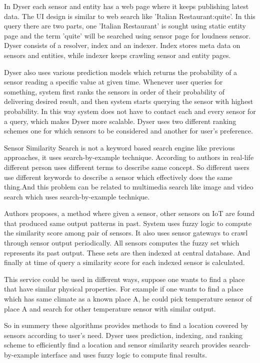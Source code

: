 \documentclass [a4paper,12pt]{book}
\begin{document}
In Dyser\cite{17} each sensor and entity has a web page where it keeps publishing latest data. The UI design is similar to web search like 'Italian Restaurant:quite'. In this query there are two parts, one 'Italian Restaurant' is sought using static entity page and the term 'quite' will be searched using sensor page for loudness sensor. Dyser consists of a resolver, index and an indexer. Index stores meta data on sensors and entities, while indexer keeps crawling sensor and entity pages. 

Dyser also uses various prediction models which returns the probability of a sensor reading a specific value at given time. Whenever user queries for something, system first ranks the sensors in order of their probability of delivering desired result, and then system starts querying the sensor with highest probability. In this way system does not have to contact each and every sensor for a query, which makes Dyser more scalable. Dyser uses two different ranking schemes one for which sensors to be considered and another for user's preference.

Sensor Similarity Search is not a keyword based search engine like previous approaches, it uses search-by-example technique. According to authors in real-life different person uses different terms to describe same concept. So different users use different keywords to describe a sensor which effectively does the same thing.And this problem can be related to multimedia search like image and video search which uses search-by-example technique. 

Authors proposes, a method where given a sensor, other sensors on IoT are found that produced same output patterns in past. System uses fuzzy logic to compute the similarity score among pair of sensors. It also uses sensor gateways to crawl through sensor output periodically. All sensors computes the fuzzy set which represents its past output. These sets are then indexed at central database. And finally at time of query a similarity score for each indexed sensor is calculated.

This service could be used in different ways, suppose one wants to find a place that have similar physical properties. For example if one wants to find a place which has same climate as a known place A, he could pick temperature sensor of place A and search for other temperature sensor with similar output.

So in summery these algorithms provides methods to find a location covered by sensors according to user's need. Dyser uses prediction, indexing, and ranking scheme to efficiently find a location and sensor similarity search provides search-by-example interface and uses fuzzy logic to compute final results.
\end{document}
